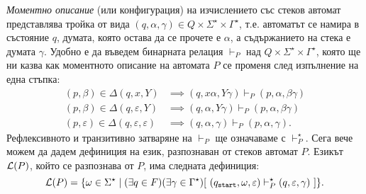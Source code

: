 {\em Моментно описание} (или конфигурация) на изчислението със стеков автомат представлява тройка от вида $(q,\alpha,\gamma) \in Q\times\Sigma^\star\times\Gamma^\star$,
т.е. автоматът се намира в състояние $q$, думата, която остава да се прочете е $\alpha$,
а съдържанието на стека е думата $\gamma$.
Удобно е да въведем бинарната релация $\vdash_P$ над $Q\times\Sigma^\star\times\Gamma^\star$,
която ще ни казва как моментното описание на автомата $P$ се променя след изпълнение на една стъпка:
\begin{align*}
  (p,\beta) \in \Delta(q,x,Y) & \implies (q,x\alpha,Y\gamma) \vdash_P (p,\alpha,\beta\gamma)\\
  (p,\beta) \in \Delta(q,\varepsilon,Y) & \implies (q,\alpha,Y\gamma) \vdash_P (p,\alpha,\beta\gamma)\\
  (p,\varepsilon) \in \Delta(q,\varepsilon,\varepsilon) & \implies (q,\alpha,\gamma) \vdash_P (p,\alpha,\gamma).
\end{align*}
Рефлексивното и транзитивно затваряне на $\vdash_P$ ще означаваме с $\vdash^\star_P$.
Сега вече можем да дадем дефиниция на език, разпознаван от стеков автомат $P$.
Езикът $\mathcal{L}(P)$, който се разпознава от $P$, има следната дефиниция:
\[\mathcal{L}(P) = \{\omega \in \Sigma^\star \mid (\exists q \in F)(\exists \gamma \in \Gamma^\star)[\ (q_{\texttt{start}},\omega,\varepsilon) \vdash^\star_P (q,\varepsilon,\gamma)\ ]\}.\]    

